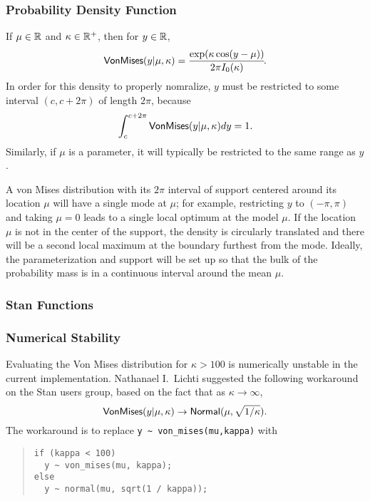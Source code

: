 \subsubsection{Probability Density Function}

If $\mu \in \reals$ and $\kappa \in \posreals$, then for $y \in
\reals$,
%
\[
\distro{VonMises}(y|\mu,\kappa)
=
\frac{\exp(\kappa\cos(y-\mu))}{2\pi I_0(\kappa)}
\!.
\]
%
In order for this density to properly nomralize, $y$ must be
restricted to some interval  $(c, c + 2\pi)$ of length $2 \pi$,
because
%
\[
\int_{c}^{c + 2\pi} \distro{VonMises}(y|\mu,\kappa) dy
= 1.
\]
%
Similarly, if $\mu$ is a parameter, it will typically be restricted to
the same range as $y$.  

A von Mises distribution with its $2 \pi$ interval of support centered
around its location $\mu$ will have a single mode at $\mu$; for
example, restricting $y$ to $(-\pi,\pi)$ and taking $\mu = 0$ leads to
a single local optimum at the model $\mu$.  If the location $\mu$ is
not in the center of the support, the density is circularly translated
and there will be a second local maximum at the boundary furthest from
the mode.  Ideally, the parameterization and support will be set up so
that the bulk of the probability mass is in a continuous interval
around the mean $\mu$.


\subsubsection{Stan Functions}

\begin{description}
\end{description}

\subsubsection{Numerical Stability}

Evaluating the Von Mises distribution for $\kappa > 100$ is
numerically unstable in the current implementation.  Nathanael I.\
Lichti suggested the following workaround on the Stan users group,
based on the fact that as $\kappa \rightarrow \infty$,
\[
\distro{VonMises}(y|\mu,\kappa) \rightarrow \distro{Normal}(\mu,
\sqrt{1 / \kappa}).
\]
%
The workaround is to replace \Verb|y ~ von_mises(mu,kappa)| with
%
\begin{quote}
\begin{Verbatim}
if (kappa < 100)
  y ~ von_mises(mu, kappa);
else 
  y ~ normal(mu, sqrt(1 / kappa));
\end{Verbatim}
\end{quote} 


